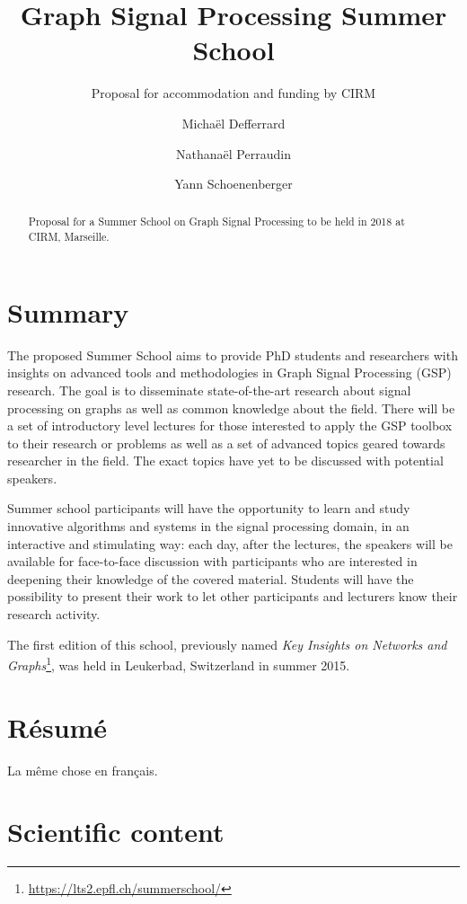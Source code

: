 \documentclass[a4paper]{scrartcl}
\begin{document}
\title{Graph Signal Processing Summer School}
\subtitle{Proposal for accommodation and funding by CIRM}
\author{
	Michaël Defferrard \and
	Nathanaël Perraudin \and
	Yann Schoenenberger \and
}
\maketitle

\begin{abstract}
	Proposal for a Summer School on Graph Signal Processing to be held in 2018
	at CIRM, Marseille.
\end{abstract}

\section{Summary}

The proposed Summer School aims to provide PhD students and researchers with
insights on advanced tools and methodologies in Graph Signal Processing (GSP)
research. The goal is to disseminate state-of-the-art research about signal
processing on graphs as well as common knowledge about the field.
There will be a set of introductory level lectures for those interested to apply
the GSP toolbox to their research or problems as well as a set of advanced
topics geared towards researcher in the field. The exact topics have yet to be
discussed with potential speakers.

Summer school participants will have the opportunity to learn and study
innovative algorithms and systems in the signal processing domain, in an
interactive and stimulating way: each day, after the lectures, the speakers will
be available for face-to-face discussion with participants who are interested in
deepening their knowledge of the covered material. Students will have the
possibility to present their work to let other participants and lecturers know
their research activity.

The first edition of this school, previously named \textit{Key Insights on
Networks and Graphs}\footnote{ \url{https://lts2.epfl.ch/summerschool/}}, was
held in Leukerbad, Switzerland in summer 2015.

\section{Résumé}

La même chose en français.

\section{Scientific content}
\end{document}
